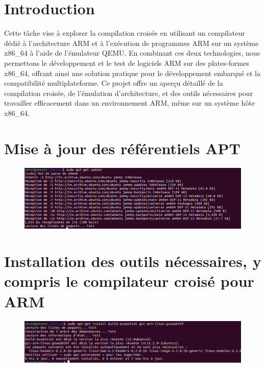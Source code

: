 \section*{Introduction} \label{sec:Introduction}


Cette tâche vise à explorer la compilation croisée en utilisant un compilateur dédié à l'architecture ARM et à l'exécution de programmes ARM sur un système x86\_64 à l'aide de l'émulateur QEMU. En combinant ces deux technologies, nous permettons le développement et le test de logiciels ARM sur des plates-formes x86\_64, offrant ainsi une solution pratique pour le développement embarqué et la compatibilité multiplateforme. Ce projet offre un aperçu détaillé de la compilation croisée, de l'émulation d'architecture, et des outils nécessaires pour travailler efficacement dans un environnement ARM, même sur un système hôte x86\_64.



\section{Mise à jour des référentiels APT}
\begin{figure}[h]
  
    \includegraphics[width=1\textwidth]{images/Mise à jour des référentiels APT.png}
     
\end{figure}

\section{Installation des outils nécessaires, y compris le compilateur croisé pour ARM}

\begin{figure}[h]
  
    \includegraphics[width=1\textwidth]{images/outil.png}
   
\end{figure}

